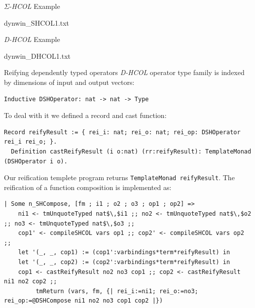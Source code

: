 \documentclass[aspectratio=169]{beamer}
\newcommand{\SHCOL}{\texorpdfstring{$\Sigma$-\emph{HCOL}}{Sigma-HCOL}}
\newcommand{\DHCOL}{\emph{D-HCOL}}
\begin{document}
\begin{frame}[fragile]{{\SHCOL} Example}
  \vspace{-2mm}
  
  {dynwin_SHCOL1.txt}
\end{frame}

\begin{frame}[fragile]{{\DHCOL} Example}
  \vspace{-2mm}
  
  {dynwin_DHCOL1.txt}
\end{frame}

\begin{frame}[fragile]{Reifying dependently typed operators}
  {}{\DHCOL} operator type family is indexed by dimensions of input
  and output vectors:
  \begin{lstlisting}[language=Coq, mathescape=true, frame=single]
  Inductive DSHOperator: nat -> nat -> Type
  \end{lstlisting}

  To deal with it we defined a record and cast function:

  \begin{lstlisting}[language=Coq, mathescape=true, frame=single]
  Record reifyResult := { rei_i: nat; rei_o: nat; rei_op: DSHOperator rei_i rei_o; }.
  Definition castReifyResult (i o:nat) (rr:reifyResult): TemplateMonad (DSHOperator i o).
  \end{lstlisting}

  Our reification templete program returns
  \lstinline[language=Coq]{TemplateMonad reifyResult}. The reification
  of a function composition is implemented as:

  \begin{lstlisting}[language=Coq, mathescape=true, frame=single, basicstyle=\scriptsize]
  | Some n_SHCompose, [fm ; i1 ; o2 ; o3 ; op1 ; op2] =>
    ni1 <- tmUnquoteTyped nat$\,$i1 ;; no2 <- tmUnquoteTyped nat$\,$o2 ;; no3 <- tmUnquoteTyped nat$\,$o3 ;;
    cop1' <- compileSHCOL vars op1 ;; cop2' <- compileSHCOL vars op2 ;;
    let '(_, _, cop1) := (cop1':varbindings*term*reifyResult) in
    let '(_, _, cop2) := (cop2':varbindings*term*reifyResult) in
    cop1 <- castReifyResult no2 no3 cop1 ;; cop2 <- castReifyResult ni1 no2 cop2 ;;
         tmReturn (vars, fm, {| rei_i:=ni1; rei_o:=no3; rei_op:=@DSHCompose ni1 no2 no3 cop1 cop2 |})
  \end{lstlisting}
    
\end{frame}
\end{document}

